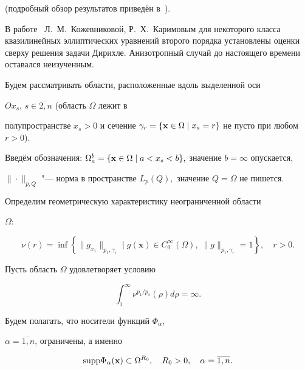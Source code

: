 (подробный обзор результатов приведён в~\cite{KozhKhad:bib:Kozhevnikova}).

 В работе~\cite{KozhKhad:bib:KozhKarimov} Л.~М.~Кожевниковой, Р.~Х.~Каримовым для некоторого класса  квазилинейных эллиптических уравнений второго порядка установлены оценки сверху решения задачи Дирихле. Анизотропный случай до настоящего времени оставался неизученным.



Будем рассматривать области, расположенные вдоль выделенной оси

$Ox_s$, $s\in\overline{2,n}$ (область $\Omega$ лежит в

полупространстве $x_s>0$ и сечение $\gamma_r=\{{\bf x}\in\Omega

\mid x_s=r\}$ не пусто при любом $r>0$).



Введём обозначения: $\Omega_a^b=\{{\bf x}\in

\Omega \mid a<x_s<b\},$ значение $b=\infty$ опускается,

$\|{}\cdot{}\|_{p,Q}$ "--- норма в пространстве $L_p(Q),$ значение $Q=\Omega$ не пишется.



Определим геометрическую характеристику неограниченной области

$\Omega$:

\begin{equation}

\nu(r)=\inf\left\{ \|g_{x_1} \|_{p_1,\gamma_r}

\mid g(\textbf{x})\in C_0^{\infty}(\Omega),\;

\|g\|_{p_1,\gamma_r}=1\right \},\quad r>0.\label{eq:Kozh:nu}

\end{equation}



Пусть область $\Omega$ удовлетворяет условию

\begin{equation}

\int_1^{\infty}\nu^{p_1/p_s}(\rho)d\rho=\infty\label{eq:Kozh:ii}.

\end{equation}

Будем полагать, что носители функций $\Phi_{\alpha}$,

$\alpha=\overline{1,n}$, ограничены, а именно

\begin{equation}

{\rm supp} \Phi_\alpha({\bf x})\subset\Omega^{R_0},\quad R_0>0,

\quad \alpha=\overline{1,n}.\label{eq:Kozh:phi}

\end{equation}



